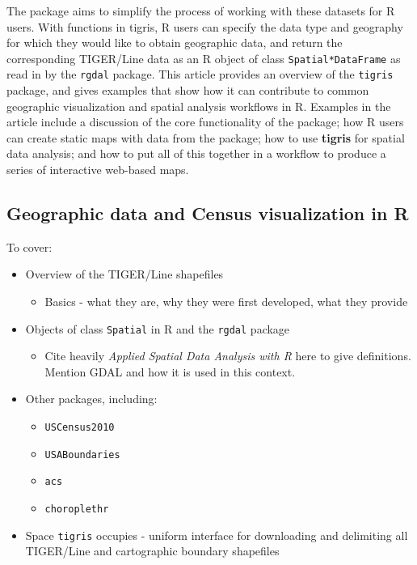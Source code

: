 The  package aims to simplify the process of working
with these datasets for R users. With functions in tigris, R users can
specify the data type and geography for which they would like to obtain
geographic data, and return the corresponding TIGER/Line data as an R
object of class \texttt{Spatial*DataFrame} as read in by the
\texttt{rgdal} package. This article provides an overview of the
\texttt{tigris} package, and gives examples that show how it can
contribute to common geographic visualization and spatial analysis
workflows in R. Examples in the article include a discussion of the core
functionality of the package; how R users can create static maps with
data from the package; how to use \textbf{tigris} for spatial data
analysis; and how to put all of this together in a workflow to produce a
series of interactive web-based maps.

\subsection{Geographic data and Census visualization in
R}\label{geographic-data-and-census-visualization-in-r}

To cover:

\begin{itemize}
\tightlist
\item
  Overview of the TIGER/Line shapefiles

  \begin{itemize}
  \tightlist
  \item
    Basics - what they are, why they were first developed, what they
    provide
  \end{itemize}
\item
  Objects of class \texttt{Spatial} in R and the \texttt{rgdal} package

  \begin{itemize}
  \tightlist
  \item
    Cite heavily \emph{Applied Spatial Data Analysis with R} here to
    give definitions. Mention GDAL and how it is used in this context.\\
  \end{itemize}
\item
  Other packages, including:

  \begin{itemize}
  \tightlist
  \item
    \texttt{USCensus2010}
  \item
    \texttt{USABoundaries}
  \item
    \texttt{acs}
  \item
    \texttt{choroplethr}
  \end{itemize}
\item
  Space \texttt{tigris} occupies - uniform interface for downloading and
  delimiting all TIGER/Line and cartographic boundary shapefiles
\end{itemize}

